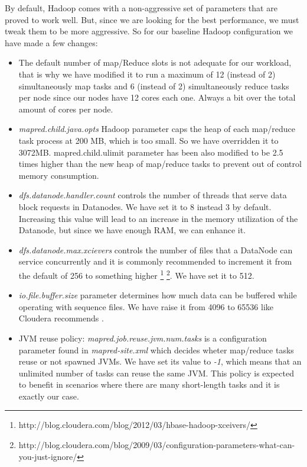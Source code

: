 By default, Hadoop comes with a non-aggressive set of parameters that are proved to work well. But, since we are looking for the best performance, we must tweak them to be more aggressive. So for our baseline Hadoop configuration we have made a few changes: 
\begin{itemize}
\item The default number of map/Reduce slots is not adequate for our workload, that is why we have modified it to run a maximum of 12 (instead of 2) simultaneously map tasks and 6 (instead of 2) simultaneously reduce tasks per node since our nodes have 12 cores each one. Always a bit over the total amount of cores per node.
\item \textit{mapred.child.java.opts} Hadoop parameter caps the heap of each map/reduce task process at 200 MB, which is too small. So we have overridden it to 3072MB. {mapred.child.ulimit} parameter has been also modified to be 2.5 times higher than the new heap of map/reduce tasks to prevent out of control memory consumption.
\item \textit{dfs.datanode.handler.count} controls the number of threads that serve data block requests in Datanodes. We have set it to 8 instead 3 by default. Increasing this value will lead to an increase in the memory utilization of the Datanode, but since we have enough RAM, we can enhance it.
\item \textit{dfs.datanode.max.xcievers} controls the number of files that a DataNode can service concurrently and it is commonly recommended to increment it from the default of 256 to something higher \footnote{http://blog.cloudera.com/blog/2012/03/hbase-hadoop-xceivers/}  \footnote{\label{1}http://blog.cloudera.com/blog/2009/03/configuration-parameters-what-can-you-just-ignore/}. We have set it to 512.
\item \textit{io.file.buffer.size} parameter determines how much data can be buffered while operating with sequence files. We have raise it from 4096 to 65536 like Cloudera recommends \footnotemark[1].
\item JVM reuse policy: \textit{mapred.job.reuse.jvm.num.tasks} is a configuration parameter found in \textit{mapred-site.xml} which decides wheter map/reduce tasks reuse or not spawned JVMs. We have set its value to \textit{-1}, which means that an unlimited number of tasks can reuse the same JVM. This policy is expected to benefit in scenarios where there are many short-length tasks and it is exactly our case.
\end{itemize}






